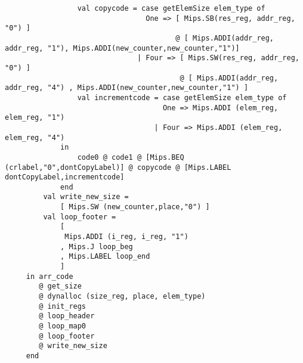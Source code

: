 \documentclass{article}
\begin{document}
\begin{lstlisting}
                 val copycode = case getElemSize elem_type of
                                 One => [ Mips.SB(res_reg, addr_reg, "0") ]
                                        @ [ Mips.ADDI(addr_reg, addr_reg, "1"), Mips.ADDI(new_counter,new_counter,"1")]
                               | Four => [ Mips.SW(res_reg, addr_reg, "0") ]
                                         @ [ Mips.ADDI(addr_reg, addr_reg, "4") , Mips.ADDI(new_counter,new_counter,"1") ]
                 val incrementcode = case getElemSize elem_type of
                                     One => Mips.ADDI (elem_reg, elem_reg, "1")
                                   | Four => Mips.ADDI (elem_reg, elem_reg, "4")
             in    
                 code0 @ code1 @ [Mips.BEQ (crlabel,"0",dontCopyLabel)] @ copycode @ [Mips.LABEL dontCopyLabel,incrementcode]
             end
         val write_new_size =
             [ Mips.SW (new_counter,place,"0") ]
         val loop_footer =
             [ 
              Mips.ADDI (i_reg, i_reg, "1")
             , Mips.J loop_beg
             , Mips.LABEL loop_end
             ]
     in arr_code
        @ get_size
        @ dynalloc (size_reg, place, elem_type)
        @ init_regs
        @ loop_header
        @ loop_map0
        @ loop_footer
        @ write_new_size
     end
\end{lstlisting}
\end{document}
